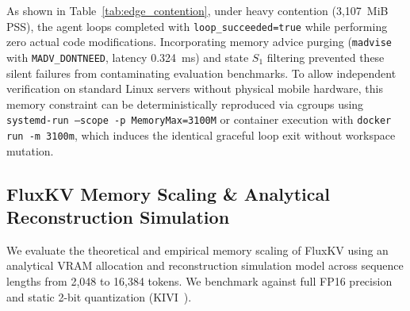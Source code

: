 \documentclass[10pt,twocolumn]{article}
\begin{document}
\begin{table}[t]
\centering
\small
\caption{Edge Memory Contention Profiling (Gemma~4 E2B on Android).}
\label{tab:edge_contention}
\end{table}

As shown in Table~\ref{tab:edge_contention}, under heavy contention (3,107~MiB PSS), the agent loops completed with \texttt{loop\_succeeded=true} while performing zero actual code modifications. Incorporating memory advice purging (\texttt{madvise} with \texttt{MADV\_DONTNEED}, latency 0.324~ms) and state $S_1$ filtering prevented these silent failures from contaminating evaluation benchmarks. To allow independent verification on standard Linux servers without physical mobile hardware, this memory constraint can be deterministically reproduced via cgroups using \texttt{systemd-run --scope -p MemoryMax=3100M} or container execution with \texttt{docker run -m 3100m}, which induces the identical graceful loop exit without workspace mutation.

\subsection{FluxKV Memory Scaling \& Analytical Reconstruction Simulation}
We evaluate the theoretical and empirical memory scaling of FluxKV using an analytical VRAM allocation and reconstruction simulation model across sequence lengths from 2,048 to 16,384 tokens. We benchmark against full FP16 precision and static 2-bit quantization (KIVI~\cite{liu2024kivi}).
\end{document}
